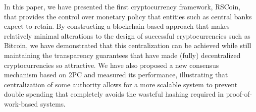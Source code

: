 \documentclass[conference]{IEEEtran}
\newcommand{\rscoin}{\textsf{RSCoin}\xspace}
\begin{document}
In this paper, we have presented the first cryptocurrency framework, \rscoin,
that provides the control over monetary policy that entities such as central
banks expect to retain.  By constructing a blockchain-based approach that
makes
relatively minimal alterations to the design of successful cryptocurrencies
such
as Bitcoin, we have demonstrated that this centralization can be achieved
while
still maintaining the transparency guarantees that have made
(fully) decentralized cryptocurrencies so attractive.  We have also
proposed a new consensus mechanism based on 2PC and
measured its performance, illustrating that centralization of some authority
allows
for a more scalable system to prevent double spending that completely avoids
the wasteful hashing required in proof-of-work-based systems.


\fi
\end{document}

